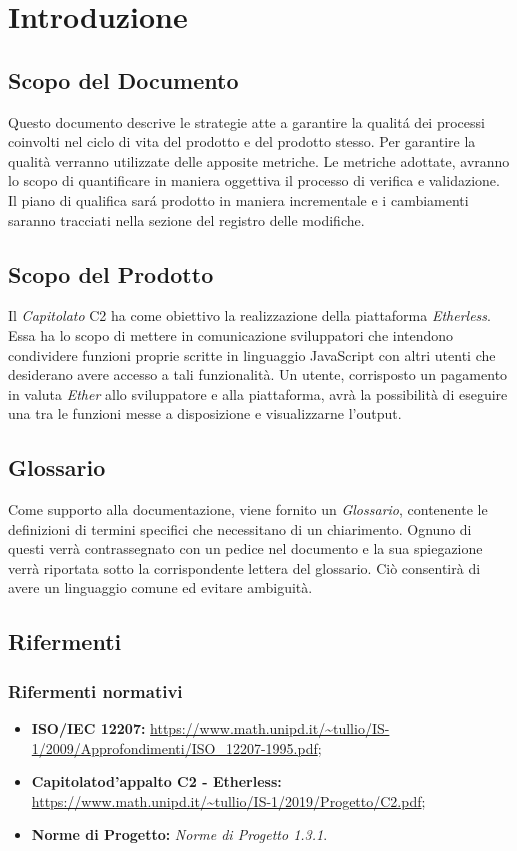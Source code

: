 \section{Introduzione}

\subsection{Scopo del Documento}
Questo documento descrive le strategie atte a garantire la qualit\'a dei processi coinvolti nel ciclo di vita del prodotto e del prodotto stesso. Per garantire la qualità verranno utilizzate delle apposite metriche. Le metriche adottate, avranno lo scopo di quantificare in maniera oggettiva il processo di verifica e validazione. Il piano di qualifica sar\'a prodotto in maniera incrementale e i cambiamenti saranno tracciati nella sezione del registro delle modifiche.


\subsection{Scopo del Prodotto}
Il \textit{Capitolato\glo} C2 ha come obiettivo la realizzazione della piattaforma \textit{Etherless}. Essa ha lo scopo di mettere in comunicazione sviluppatori che intendono condividere funzioni proprie scritte in linguaggio JavaScript con altri utenti che desiderano avere accesso a tali funzionalità. Un utente, corrisposto un pagamento in valuta \textit{Ether\glo} allo sviluppatore e alla piattaforma, avrà la possibilità di eseguire una tra le funzioni messe a disposizione e visualizzarne l'output.

\subsection{Glossario}
Come supporto alla documentazione, viene fornito un \textit{Glossario}\docs,
contenente le definizioni di termini specifici che necessitano di un chiarimento.
Ognuno di questi verr\`a contrassegnato con un pedice \glo nel documento e la sua
spiegazione verr\`a riportata sotto la corrispondente lettera del glossario. Ci\`o
consentir\`a di avere un linguaggio comune ed evitare ambiguit\`a.

\subsection{Rifermenti}
\subsubsection{Rifermenti normativi}
\begin{itemize}
\item \textbf{ISO/IEC 12207:} \url{https://www.math.unipd.it/~tullio/IS-1/2009/Approfondimenti/ISO_12207-1995.pdf};
\item \textbf{Capitolato\glo d'appalto C2 - Etherless:} \url{https://www.math.unipd.it/~tullio/IS-1/2019/Progetto/C2.pdf};
\item \textbf{Norme di Progetto:} \textit{Norme di Progetto 1.3.1\docs}.
\end{itemize}
